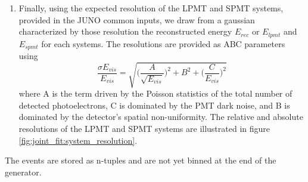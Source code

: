 \documentclass[../main.tex]{subfiles}
\begin{document}
\begin{enumerate}
  \item Finally, using the expected resolution of the LPMT and SPMT systems,  provided in the JUNO common inputs, we draw from a gaussian characterized by those resolution the reconstructed energy $E_{rec}$ or $E_{lpmt}$ and $E_{spmt}$ for each systems. The resolutions are provided as ABC parameters using
    \begin{equation}
      \frac{\sigma E_{vis}}{E_{vis}} = \sqrt{\bigg(\frac{A}{\sqrt{E_{vis}}}\bigg)^2 + B^2 + \bigg(\frac{C}{E_{vis}}\bigg)^2}
    \end{equation}
    where A is the term driven by the Poisson statistics of the total number of detected photoelectrons, C is dominated by the PMT dark noise, and B is dominated by the detector’s spatial non-uniformity. The relative and absolute resolutions of the LPMT and SPMT systems are illustrated in figure \ref{fig:joint_fit:system_resolution}.
\end{enumerate}

The events are stored as n-tuples and are not yet binned at the end of the generator.
\end{document}
